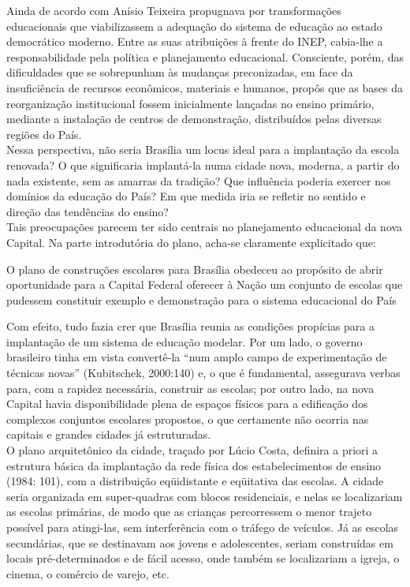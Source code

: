 Ainda de acordo com  Anísio Teixeira propugnava por transformações educacionais que viabilizassem
a adequação do sistema de educação ao estado democrático moderno. Entre as suas
atribuições à frente do INEP, cabia-lhe a responsabilidade pela política e planejamento
educacional. Consciente, porém, das dificuldades que se sobrepunham às mudanças
preconizadas, em face da insuficiência de recursos econômicos, materiais e humanos,
propôs que as bases da reorganização institucional fossem inicialmente lançadas no
ensino primário, mediante a instalação de centros de demonstração, distribuídos pelas
diversas regiões do País. \\

Nessa perspectiva, não seria Brasília um locus ideal para a implantação da escola
renovada? O que significaria implantá-la numa cidade nova, moderna, a partir do nada
existente, sem as amarras da tradição? Que influência poderia exercer nos domínios da educação do País? Em que medida iria se refletir no sentido e direção das tendências do
ensino? \\

    Tais preocupações parecem ter sido centrais no planejamento educacional da
nova Capital. Na parte introdutória do plano, acha-se claramente explicitado que:

\begin{citacao}
    O plano de construções escolares para Brasília obedeceu ao propósito de
    abrir oportunidade para a Capital Federal oferecer à Nação um conjunto de
    escolas que pudessem constituir exemplo e demonstração para o sistema
    educacional do País
\end{citacao}


Com efeito, tudo fazia crer que Brasília reunia as condições propícias para a
implantação de um sistema de educação modelar. Por um lado, o governo brasileiro
tinha em vista convertê-la “num amplo campo de experimentação de técnicas novas”
(Kubitschek, 2000:140) e, o que é fundamental, assegurava verbas para, com a rapidez
necessária, construir as escolas; por outro lado, na nova Capital havia disponibilidade
plena de espaços físicos para a edificação dos complexos conjuntos escolares propostos,
o que certamente não ocorria nas capitais e grandes cidades já estruturadas.\\

O plano arquitetônico da cidade, traçado por Lúcio Costa, definira a priori a
estrutura básica da implantação da rede física dos estabelecimentos de ensino (1984:
101), com a distribuição eqüidistante e eqüitativa das escolas. A cidade seria organizada
em super-quadras com blocos residenciais, e nelas se localizariam as escolas primárias,
de modo que as crianças percorressem o menor trajeto possível para atingi-las, sem
interferência com o tráfego de veículos. Já as escolas secundárias, que se destinavam
aos jovens e adolescentes, seriam construídas em locais pré-determinados e de fácil
acesso, onde também se localizariam a igreja, o cinema, o comércio de varejo, etc.\\

